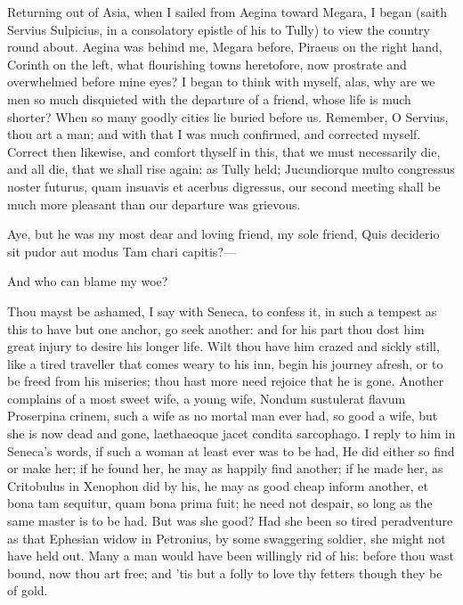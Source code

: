 {Returning out of Asia, when I sailed from Aegina toward Megara, I
began (saith Servius Sulpicius, in a consolatory epistle of his to
Tully) to view the country round about. Aegina was behind me, Megara
before, Piraeus on the right hand, Corinth on the left, what
flourishing towns heretofore, now prostrate and overwhelmed before mine
eyes? I began to think with myself, alas, why are we men so much
disquieted with the departure of a friend, whose life is much shorter?
When so many goodly cities lie buried before us. Remember, O
Servius, thou art a man; and with that I was much confirmed, and
corrected myself. Correct then likewise, and comfort thyself in this,
that we must necessarily die, and all die, that we shall rise again: as
Tully held; Jucundiorque multo congressus noster futurus, quam insuavis
et acerbus digressus, our second meeting shall be much more pleasant
than our departure was grievous.

Aye, but he was my most dear and loving friend, my sole friend,
Quis deciderio sit pudor aut modus
Tam chari capitis?---

And who can blame my woe?

Thou mayst be ashamed, I say with Seneca, to confess it, in such
a tempest as this to have but one anchor, go seek another: and
for his part thou dost him great injury to desire his longer life.
Wilt thou have him crazed and sickly still, like a tired
traveller that comes weary to his inn, begin his journey afresh, or to
be freed from his miseries; thou hast more need rejoice that he is
gone. Another complains of a most sweet wife, a young wife, Nondum
sustulerat flavum Proserpina crinem, such a wife as no mortal man ever
had, so good a wife, but she is now dead and gone, laethaeoque jacet
condita sarcophago. I reply to him in Seneca's words, if such a woman
at least ever was to be had, He did either so find or make her;
if he found her, he may as happily find another; if he made her, as
Critobulus in Xenophon did by his, he may as good cheap inform another,
et bona tam sequitur, quam bona prima fuit; he need not despair, so
long as the same master is to be had. But was she good? Had she been so
tired peradventure as that Ephesian widow in Petronius, by some
swaggering soldier, she might not have held out. Many a man would have
been willingly rid of his: before thou wast bound, now thou art free;
and 'tis but a folly to love thy fetters though they be of gold.

}
